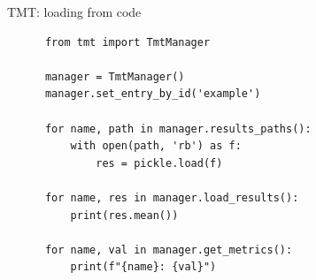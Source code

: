\documentclass[aspectratio=169,xcolor={dvipsnames}]{beamer}
\begin{document}
  \begin{frame}[fragile]{TMT: loading from code}
    \begin{verbatim}
      from tmt import TmtManager

      manager = TmtManager()
      manager.set_entry_by_id('example')

      for name, path in manager.results_paths():
          with open(path, 'rb') as f:
              res = pickle.load(f)

      for name, res in manager.load_results():
          print(res.mean())

      for name, val in manager.get_metrics():
          print(f"{name}: {val}")
    \end{verbatim}
  \end{frame}
\end{document}
